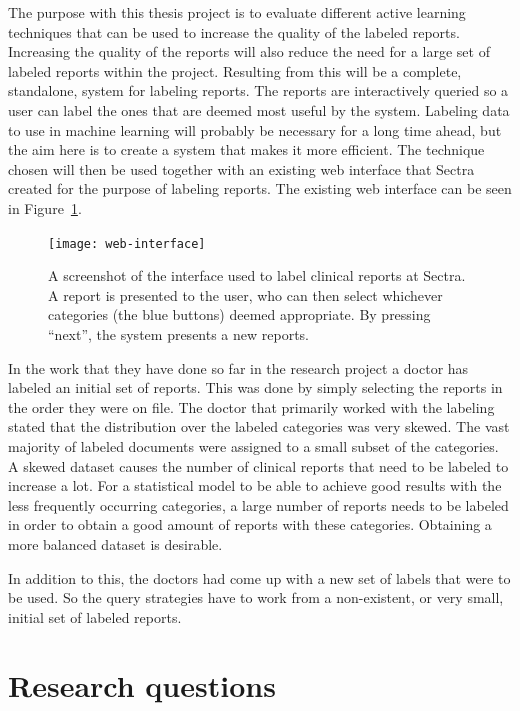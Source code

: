 The purpose with this thesis project is to evaluate different active learning techniques that can be used to increase the quality of the labeled reports.
Increasing the quality of the reports will also reduce the need for a large set of labeled reports within the project.
Resulting from this will be a complete, standalone, system for labeling reports.
The reports are interactively queried so a user can label the ones that are deemed most useful by the system.
Labeling data to use in machine learning will probably be necessary for a long time ahead, but the aim here is to create a system that makes it more efficient.
The technique chosen will then be used together with an existing web interface that Sectra created for the purpose of labeling reports.
The existing web interface can be seen in Figure~\ref{fig:web-interface}.

\begin{figure}
      \centering
      \texttt{[image: web-interface]}
      \caption{A screenshot of the interface used to label clinical reports at Sectra. 
               A report is presented to the user, who can then select whichever categories (the blue buttons) deemed appropriate.
               By pressing ``next'', the system presents a new reports.}
      \label{fig:web-interface}
\end{figure}

In the work that they have done so far in the research project a doctor has labeled an initial set of reports.
This was done by simply selecting the reports in the order they were on file.
The doctor that primarily worked with the labeling stated that the distribution over the labeled categories was very skewed.
The vast majority of labeled documents were assigned to a small subset of the categories.
A skewed dataset causes the number of clinical reports that need to be labeled to increase a lot.
For a statistical model to be able to achieve good results with the less frequently occurring categories, a large number of reports needs to be labeled in order to obtain a good amount of reports with these categories.
Obtaining a more balanced dataset is desirable.

In addition to this, the doctors had come up with a new set of labels that were to be used.
So the query strategies have to work from a non-existent, or very small, initial set of labeled reports.

\section{Research questions}
\label{sec:research-questions}

